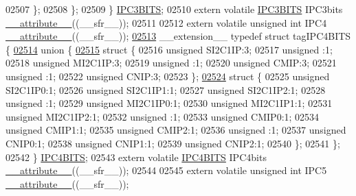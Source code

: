 \begin{DoxyCode}
02507     \};
02508   \};
02509 \} \hyperlink{a00014_dd/de9/a00552}{IPC3BITS};
02510 \textcolor{keyword}{extern} \textcolor{keyword}{volatile} \hyperlink{a00014_dd/de9/a00552}{IPC3BITS} IPC3bits \hyperlink{a00015_a493c46f03454991ccc5aa7a6e1dfb2a7}{\_\_attribute\_\_}((\_\_sfr\_\_));
02511 
02512 \textcolor{keyword}{extern} \textcolor{keyword}{volatile} \textcolor{keywordtype}{unsigned} \textcolor{keywordtype}{int}  IPC4 \hyperlink{a00015_a493c46f03454991ccc5aa7a6e1dfb2a7}{\_\_attribute\_\_}((\_\_sfr\_\_));
\hypertarget{a00015_source_l02513}{}\hyperlink{a00014}{02513} \_\_extension\_\_ \textcolor{keyword}{typedef} \textcolor{keyword}{struct }tagIPC4BITS \{
\hypertarget{a00015_source_l02514}{}\hyperlink{a00015}{02514}   \textcolor{keyword}{union }\{
\hypertarget{a00015_source_l02515}{}\hyperlink{a00015}{02515}     \textcolor{keyword}{struct }\{
02516       \textcolor{keywordtype}{unsigned} SI2C1IP:3;
02517       \textcolor{keywordtype}{unsigned} :1;
02518       \textcolor{keywordtype}{unsigned} MI2C1IP:3;
02519       \textcolor{keywordtype}{unsigned} :1;
02520       \textcolor{keywordtype}{unsigned} CMIP:3;
02521       \textcolor{keywordtype}{unsigned} :1;
02522       \textcolor{keywordtype}{unsigned} CNIP:3;
02523     \};
\hypertarget{a00015_source_l02524}{}\hyperlink{a00015}{02524}     \textcolor{keyword}{struct }\{
02525       \textcolor{keywordtype}{unsigned} SI2C1IP0:1;
02526       \textcolor{keywordtype}{unsigned} SI2C1IP1:1;
02527       \textcolor{keywordtype}{unsigned} SI2C1IP2:1;
02528       \textcolor{keywordtype}{unsigned} :1;
02529       \textcolor{keywordtype}{unsigned} MI2C1IP0:1;
02530       \textcolor{keywordtype}{unsigned} MI2C1IP1:1;
02531       \textcolor{keywordtype}{unsigned} MI2C1IP2:1;
02532       \textcolor{keywordtype}{unsigned} :1;
02533       \textcolor{keywordtype}{unsigned} CMIP0:1;
02534       \textcolor{keywordtype}{unsigned} CMIP1:1;
02535       \textcolor{keywordtype}{unsigned} CMIP2:1;
02536       \textcolor{keywordtype}{unsigned} :1;
02537       \textcolor{keywordtype}{unsigned} CNIP0:1;
02538       \textcolor{keywordtype}{unsigned} CNIP1:1;
02539       \textcolor{keywordtype}{unsigned} CNIP2:1;
02540     \};
02541   \};
02542 \} \hyperlink{a00014_d8/d75/a00555}{IPC4BITS};
02543 \textcolor{keyword}{extern} \textcolor{keyword}{volatile} \hyperlink{a00014_d8/d75/a00555}{IPC4BITS} IPC4bits \hyperlink{a00015_a493c46f03454991ccc5aa7a6e1dfb2a7}{\_\_attribute\_\_}((\_\_sfr\_\_));
02544 
02545 \textcolor{keyword}{extern} \textcolor{keyword}{volatile} \textcolor{keywordtype}{unsigned} \textcolor{keywordtype}{int}  IPC5 \hyperlink{a00015_a493c46f03454991ccc5aa7a6e1dfb2a7}{\_\_attribute\_\_}((\_\_sfr\_\_));

\end{DoxyCode}
